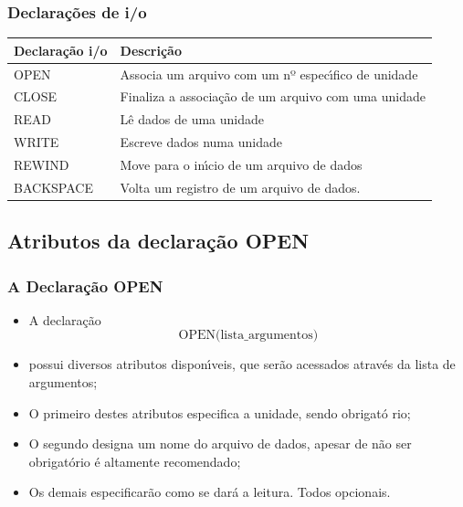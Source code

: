\documentclass[notes=show]{beamer}
\begin{document}
\begin{frame}%

\frametitle{Declara\c{c}\~{o}es de i/o}
\begin{center}
	\begin{tabular}{ l l }
		Declara\c{c}\~{a}o i/o & Descri\c{c}\~{a}o \\
		\hline \hline
		OPEN & Associa um arquivo com um nº espec\'{\i}fico de unidade \\
		CLOSE & Finaliza a associa\c{c}\~{a}o de um arquivo com uma unidade \\
		READ & L\^{e} dados de uma unidade \\
		WRITE & Escreve dados numa unidade \\
		REWIND & Move para o in\'{\i}cio de um arquivo de dados \\
		BACKSPACE & Volta um registro de um arquivo de dados. \\
		\hline
	\end{tabular}
\end{center}

\end{frame}%

\subsection{Atributos da declara\c{c}\~{a}o OPEN}

\begin{frame}%

\frametitle{A Declara\c{c}\~{a}o OPEN}

\begin{itemize}
\item A declara\c{c}\~{a}o 
\[ \text{OPEN(lista\_argumentos)}\]
\item possui diversos
atributos dispon\'{\i}veis, que ser\~{a}o acessados atrav\'{e}s da lista de
argumentos;

\item O primeiro destes atributos especifica a unidade, sendo obrigat\'{o}%
rio;
\item O segundo designa um nome do arquivo de dados, apesar de n\~{a}o ser
obrigat\'{o}rio \'{e} altamente recomendado;
\item Os demais especificar\~{a}o
como se dar\'{a} a leitura. Todos opcionais.

\end{itemize}

\end{frame}%
\end{document}
